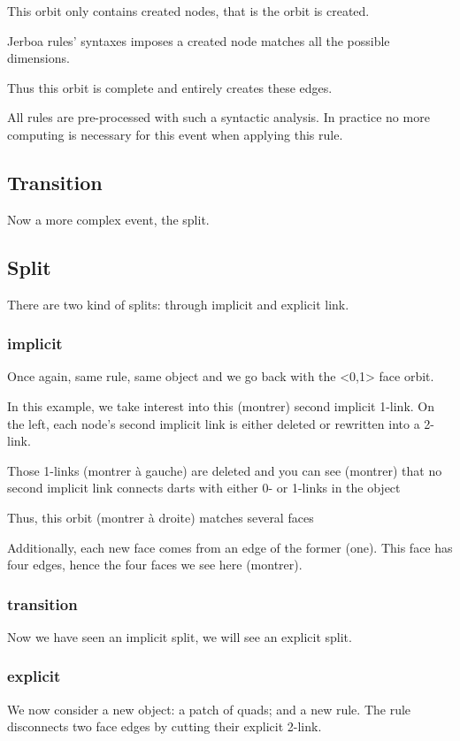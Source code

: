 \documentclass[11pt]{article}
\begin{document}
This orbit only contains created nodes, that is the orbit is created.

Jerboa rules' syntaxes imposes a created node matches all the possible
dimensions.

Thus this orbit is complete and entirely creates these edges.

All rules are pre-processed with such a syntactic analysis. In practice no more
computing is necessary for this event when applying this rule.

\subsection{Transition}
\label{sec:org2a7c480}
Now a more complex event, the split.

\subsection{Split}
\label{sec:orgc979e85}
There are two kind of splits: through implicit and explicit link.
\subsubsection{implicit}
\label{sec:orgd691b99}

Once again, same rule, same object and we go back with the <0,1> face orbit.

In this example, we take interest into this (montrer) second implicit 1-link. On
the left, each node's second implicit link is either deleted or rewritten into
a 2-link.

Those 1-links (montrer à gauche) are deleted and you can see (montrer) that no
second implicit link connects darts with either 0- or 1-links in the object

Thus, this orbit (montrer à droite) matches several faces

Additionally, each new face comes from an edge of the former (one). This face has four
edges, hence the four faces we see here (montrer).

\subsubsection{transition}
\label{sec:orgc199c3f}

Now we have seen an implicit split, we will see an explicit split.

\subsubsection{explicit}
\label{sec:org7470f8d}
We now consider a new object: a patch of quads; and a new rule. The rule
disconnects two face edges by cutting their explicit 2-link.
\end{document}
